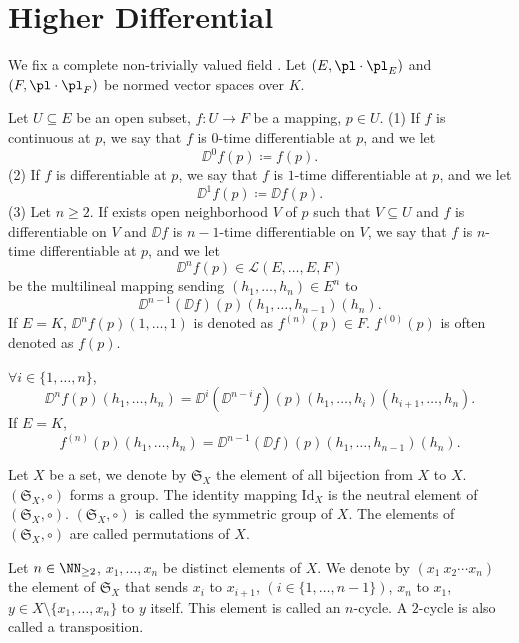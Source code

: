 \section{Higher Differential}

We fix a complete non-trivially valued field . Let $(E,\pl\cdot\pl_E)$ and $(F,\pl\cdot\pl_F)$ be normed vector spaces over $K$.

\begin{definitionenv}
    Let $U\subseteq E$ be an open subset, $f:U\longrightarrow F$ be a mapping, $p\in U$.
    \newline
    (1) If $f$ is continuous at $p$, we say that $f$ is $0$-time differentiable at $p$, and we let 
    $$\DD^0 f(p)\coloneq f(p).$$
    (2) If $f$ is differentiable at $p$, we say that $f$ is $1$-time differentiable at $p$, and we let 
    $$\DD^1 f(p)\coloneq \DD f(p).$$
    (3) Let $n\ge 2$. If exists open neighborhood $V$ of $p$ such that $V\subseteq U$ and $f$ is differentiable on $V$ and $\DD f$ is $n-1$-time differentiable on $V$, we say that $f$ is $n$-time differentiable at $p$, and we let
    $$\DD^n f(p)\in \mathscr{L}(E,\ldots,E,F)$$
    be the multilineal mapping sending $(h_1,\ldots,h_n)\in E^n$ to
    $$\DD^{n-1} (\DD f)(p)(h_1,\ldots,h_{n-1})(h_n).$$
    If $E=K$, $\DD^n f(p)(1,\ldots,1)$ is denoted as $ f^{(n)}(p)\in F$. $f^{(0)}(p)$ is often denoted as $f(p)$. 
\end{definitionenv}
\begin{remark}
    $\forall i\in \{1,\ldots,n\}$,
    $$ \DD^{n} f(p)(h_1,\ldots,h_n) = \DD^{i} (\DD^{n-i} f)(p)(h_1,\ldots,h_{i})(h_{i+1},\ldots,h_n).$$
    If $E=K$, 
    $$f^{(n)}(p)(h_1,\ldots,h_n)=\DD^{n-1} (\DD f)(p)(h_1,\ldots,h_{n-1})(h_n).$$
\end{remark}
\begin{definitionenv}
    Let $X$ be a set, we denote by $\mathfrak{S}_X$ the element of all bijection from $X$ to $X$. $(\mathfrak{S}_X,\circ)$ forms a group.
    The identity mapping $\mathrm{Id}_X$ is the neutral element of $(\mathfrak{S}_X,\circ)$. $(\mathfrak{S}_X,\circ)$ is called the symmetric group of $X$. The elements of $(\mathfrak{S}_X,\circ)$ are called permutations of $X$.

    \quad Let $n\in \NN_{\ge 2}$, $x_1,\ldots,x_n$ be distinct elements of $X$. We denote by $(x_1\ x_2\cdots x_n)$ the element of $\mathfrak{S}_X$ that sends $x_i$ to $x_{i+1}$, $(i\in \{1,\ldots,n-1\})$, $x_n$ to $x_1$, $y\in X\setminus\{x_1,\ldots,x_n\}$ to $y$ itself. This element is called an $n$-cycle.
    A $2$-cycle is also called a transposition.
\end{definitionenv}
